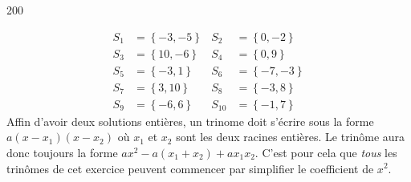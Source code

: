 


  \begin{corrige}{200}

\begin{align*}
S_{1}&=\left\{-3,-5\right\}&S_{2}&=\left\{0,-2\right\}\\
S_{3}&=\left\{10,-6\right\}&S_{4}&=\left\{0,9\right\}\\
S_{5}&=\left\{-3,1\right\}&S_{6}&=\left\{-7,-3\right\}\\
S_{7}&=\left\{3,10\right\}&S_{8}&=\left\{-3,8\right\}\\
S_{9}&=\left\{-6,6\right\}&S_{10}&=\left\{-1,7\right\}
\end{align*}
 Affin d'avoir deux solutions entières, un trinome doit s'écrire sous la forme $a(x-x_1)(x-x_2)$ où $x_1$ et $x_2$ sont les deux racines entières. Le trinôme aura donc toujours la forme $ax^2-a(x_1+x_2)+ax_1x_2$. C'est pour cela que \emph{tous} les trinômes de cet exercice peuvent commencer par simplifier le coefficient de $x^2$.
\end{corrige}
